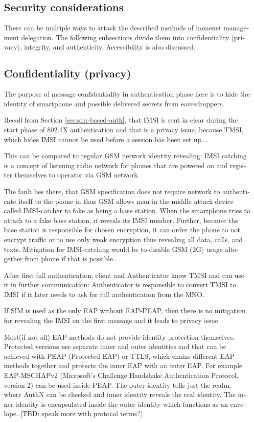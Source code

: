 \documentclass[12pt,a4paper,english]{tutthesis}
\begin{document}
\begin{otherlanguage}{english}
\section{Security considerations}
\label{sec-6-5}



There can be multiple ways to attack the described methods of
homenet management delegation. The following subsections divide them into
confidentiality (privacy), integrity, and
authenticity. Accessibility is also discussed.
\subsection{Confidentiality (privacy)}
\label{sec-6-5-1}
The purpose of message confidentiality in authentication phase here is
to hide the identity of smartphone and possible delivered secrets from
eavesdroppers. 

Recall from Section \ref{sec:sim-based-auth}, that IMSI is sent in clear 
during the start phase of 802.1X authentication and that is a privacy 
issue, because TMSI, which hides IMSI cannot be used before a session has been set up. \cite[p.66]{rfc4186}.

This can be compared to regular GSM network identity revealing: IMSI
catching is a concept of listening radio network for phones that are
powered on and register themselves to operator via GSM network.  

The
fault lies there, that GSM specification does not require network to
authenticate itself to the phone in thus GSM allows man in the middle
attack device called IMSI-catcher to fake as being a base station.
When the smartphone tries to attach to a fake base station, it reveals its
IMSI number. Further, because the base station is responsible for chosen
encryption, it can order the phone to not encrypt traffic or to use only
weak encryption thus revealing all data, calls, and
texts. Mitigation for IMSI-catching would be to
disable GSM (2G) usage altogether from phone if that is possible.\cite{imsi-heise}.

After first full authentication, client and Authenticator 
know TMSI and can use it in further communication: Authenticator 
is responsible to convert TMSI to IMSI if it later needs to 
ask for full authentication from the MNO.


If SIM is used as the only EAP without EAP-PEAP, then 
there is no mitigation for revealing the IMSI on the first message
and it leads to privacy issue.

Most(if not all) EAP methods do not provide identity protection
themselves. Protected versions
use separate  inner and outer identities and that can be achieved with
PEAP (Protected  EAP) or TTLS, which chains different EAP-methods together and
protects the inner EAP with an outer EAP. For example 
EAP-MSCHAPv2 (Microsoft's Challenge Handshake Authentication Protocol,
version 2) can be used inside PEAP.
The outer identity tells just the realm, where AuthN can be checked
 and inner identity reveals the real identity.
The inner identity is encapsulated inside the outer identity which
functions as an envelope. [TBD: speak more with protocol terms?]



\end{otherlanguage}
\end{document}
